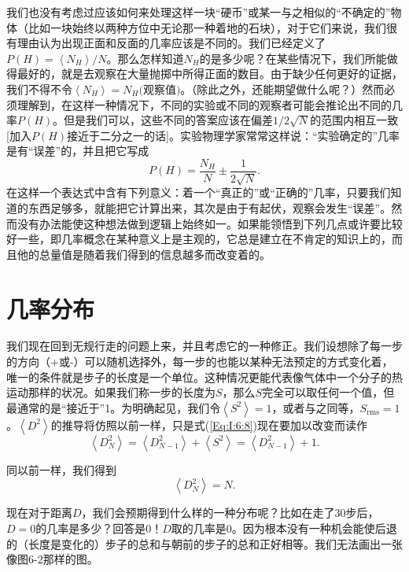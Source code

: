 \documentclass[12pt,oneside]{book}
\begin{document}
我们也没有考虑过应该如何来处理这样一块“硬币”或某一与之相似的“不确定的”物体（比如一块始终以两种方位中无论那一种着地的石块），对于它们来说，我们很有理由认为出现正面和反面的几率应该是不同的。我们已经定义了$P(H)=\left < N_H \right >/N$。那么怎样知道$N_H$的是多少呢？在某些情况下，我们所能做得最好的，就是去观察在大量抛掷中所得正面的数目。由于缺少任何更好的证据，我们不得不令$\left < N_H \right > = N_H\textrm{(观察值)}$。（除此之外，还能期望做什么呢？）然而必须理解到，在这样一种情况下，不同的实验或不同的观察者可能会推论出不同的几率$P(H)$。但是我们可以，这些不同的答案应该在偏差$1/2\sqrt{N}$的范围内相互一致[加入$P(H)$接近于二分之一的话]。实验物理学家常常这样说：“实验确定的”几率是有“误差”的，并且把它写成
\begin{equation}
\label{Eq:I:6:14}
P(H)=\frac{N_H}{N}\pm\frac{1}{2\sqrt{N}}.
\end{equation}
在这样一个表达式中含有下列意义：着一个“真正的”或“正确的”几率，只要我们知道的东西足够多，就能把它计算出来，其次是由于有起伏，观察会发生“误差”。然而没有办法能使这种想法做到逻辑上始终如一。如果能领悟到下列几点或许要比较好一些，即几率概念在某种意义上是主观的，它总是建立在不肯定的知识上的，而且他的总量值是随着我们得到的信息越多而改变着的。


\section{几率分布}
我们现在回到无规行走的问题上来，并且考虑它的一种修正。我们设想除了每一步的方向（+或-）可以随机选择外，每一步的也能以某种无法预定的方式变化着，唯一的条件就是步子的长度是一个单位。这种情况更能代表像气体中一个分子的热运动那样的状况。如果我们称一步的长度为$S$，那么$S$完全可以取任何一个值，但最通常的是“接近于”1。为明确起见，我们令$\left < S^2 \right > = 1$，或者与之同等，$S_{\text{rms}}=1$。$\left < D^2 \right > $的推导将仿照以前一样，只是式(\ref{Eq:I:6:8})现在要加以改变而读作
\begin{equation}
\label{Eq:I:6:15}
\left < D_N^2 \right >=\left <D_{N-1}^2\right >+\left <S^2\right >=\left <D_{N-1}^2\right >+1.
\end{equation}

同以前一样，我们得到
\begin{equation}
\label{Eq:I:6:16}
\left <D_N^2\right > =N.
\end{equation}

现在对于距离$D$，我们会预期得到什么样的一种分布呢？比如在走了30步后，$D=0$的几率是多少？回答是$0$！$D$取的几率是0。因为根本没有一种机会能使后退的（长度是变化的）步子的总和与朝前的步子的总和正好相等。我们无法画出一张像图6-2那样的图。
\end{document}
